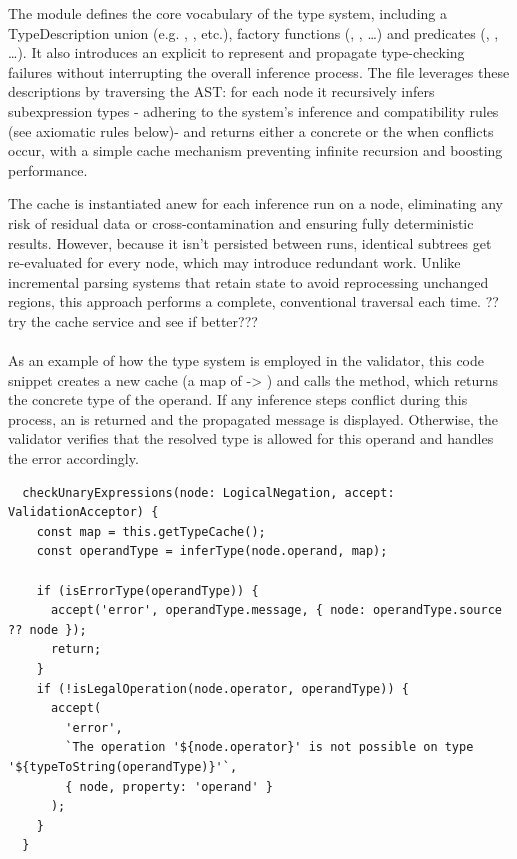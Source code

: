 The  module defines the core vocabulary of the type system, including a TypeDescription union (e.g. , , etc.),
factory functions (, , …) and predicates (, , …). It also introduces an explicit
 to represent and propagate type-checking failures without interrupting the overall inference process. The  file leverages these
descriptions by traversing the AST: for each node it recursively infers subexpression types - adhering to the system's inference and compatibility rules (see axiomatic rules below)-
and returns either a concrete  or the  when conflicts occur, with a simple cache mechanism preventing infinite recursion and boosting performance.

The cache is instantiated anew for each inference run on a node, eliminating any risk of residual data or cross-contamination and ensuring fully deterministic results.
However, because it isn't persisted between runs, identical subtrees get re-evaluated for every node, which may introduce redundant work.
Unlike incremental parsing systems that retain state to avoid reprocessing unchanged regions, this approach performs a complete, conventional traversal each time.
??try the cache service and see if better???
\\
\\
As an example of how the type system is employed in the validator, this code snippet creates a new cache (a map of  -> ) and calls the
 method, which returns the concrete type of the operand. If any inference steps conflict during this process, an  is returned and the
propagated message is displayed. Otherwise, the validator verifies that the resolved type is allowed for this operand and handles the error accordingly.

\begin{verbatim}
  checkUnaryExpressions(node: LogicalNegation, accept: ValidationAcceptor) {
    const map = this.getTypeCache();
    const operandType = inferType(node.operand, map);

    if (isErrorType(operandType)) {
      accept('error', operandType.message, { node: operandType.source ?? node });
      return;
    }
    if (!isLegalOperation(node.operator, operandType)) {
      accept(
        'error',
        `The operation '${node.operator}' is not possible on type '${typeToString(operandType)}'`,
        { node, property: 'operand' }
      );
    }
  }
\end{verbatim}

